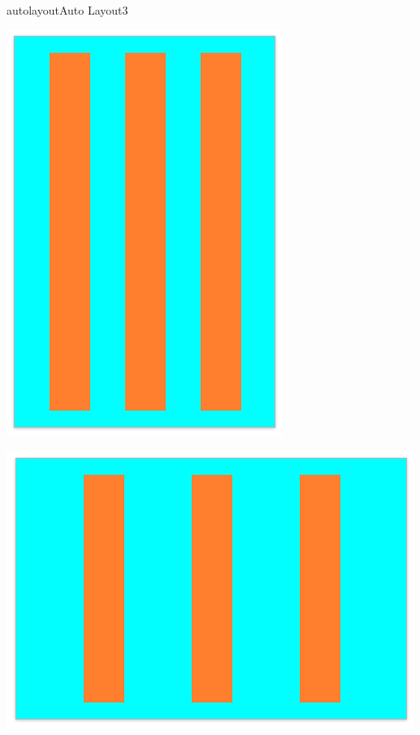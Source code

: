 \documentclass[parskip=half, final]{scrreprt}
\begin{document}
\begin{lecture}
\begin{exc}
\begin{excitem}{autolayout}{Auto Layout}{3}
\begin{enumerate}
\begin{minipage}{.5\linewidth}
  \centering
  \includegraphics[width=\linewidth, height=\linewidth, keepaspectratio]{img/al_02.png}
\end{minipage}
\begin{minipage}{.5\linewidth}
  \centering
  \includegraphics[width=\linewidth, height=\linewidth, keepaspectratio]{img/al_01.png}
\end{minipage}

\end{enumerate}

\end{excitem}

\end{exc}


\end{lecture}
\end{document}
